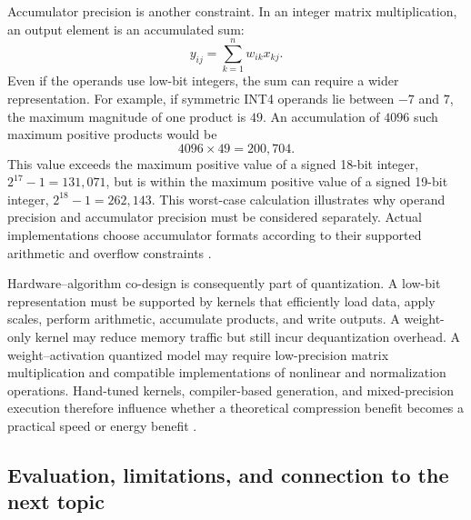 Accumulator precision is another constraint. In an integer matrix
multiplication, an output element is an accumulated sum:
\begin{equation}
    y_{ij}
    =
    \sum_{k=1}^{n}w_{ik}x_{kj}.
    \label{eq:quant-integer-accumulation}
\end{equation}
Even if the operands use low-bit integers, the sum can require a
wider representation. For example, if symmetric INT4 operands lie
between \(-7\) and \(7\), the maximum magnitude of one product is
\(49\). An accumulation of \(4096\) such maximum positive products
would be
\begin{equation}
    4096\times49=200{,}704.
    \label{eq:quant-accumulator-example}
\end{equation}
This value exceeds the maximum positive value of a signed 18-bit
integer, \(2^{17}-1=131{,}071\), but is within the maximum positive
value of a signed 19-bit integer, \(2^{18}-1=262{,}143\). This
worst-case calculation illustrates why operand precision and
accumulator precision must be considered separately. Actual
implementations choose accumulator formats according to their
supported arithmetic and overflow constraints
\parencite{song2026targetcentricqat,chen2026llmquantization}.

Hardware--algorithm co-design is consequently part of quantization.
A low-bit representation must be supported by kernels that efficiently
load data, apply scales, perform arithmetic, accumulate products, and
write outputs. A weight-only kernel may reduce memory traffic but still
incur dequantization overhead. A weight--activation quantized model
may require low-precision matrix multiplication and compatible
implementations of nonlinear and normalization operations. Hand-tuned
kernels, compiler-based generation, and mixed-precision execution
therefore influence whether a theoretical compression benefit becomes
a practical speed or energy benefit
\parencite{chen2026llmquantization}.

\subsection{Evaluation, limitations, and connection to the next topic}
\label{subsec:quant-evaluation-transition}

